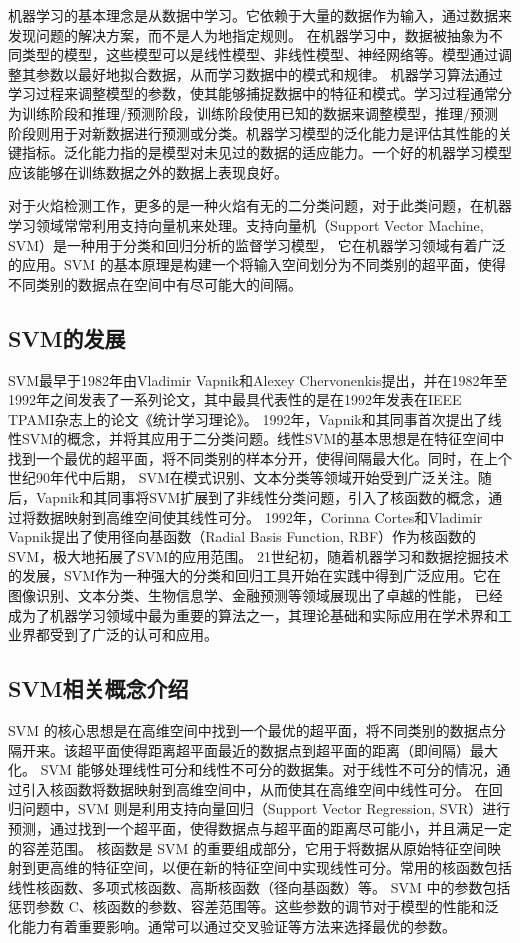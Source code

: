 机器学习的基本理念是从数据中学习。它依赖于大量的数据作为输入，通过数据来发现问题的解决方案，而不是人为地指定规则。
在机器学习中，数据被抽象为不同类型的模型，这些模型可以是线性模型、非线性模型、神经网络等。模型通过调整其参数以最好地拟合数据，从而学习数据中的模式和规律。
机器学习算法通过学习过程来调整模型的参数，使其能够捕捉数据中的特征和模式。学习过程通常分为训练阶段和推理/预测阶段，训练阶段使用已知的数据来调整模型，推理/预测
阶段则用于对新数据进行预测或分类。机器学习模型的泛化能力是评估其性能的关键指标。泛化能力指的是模型对未见过的数据的适应能力。一个好的机器学习模型应该能够在训练数据之外的数据上表现良好。

对于火焰检测工作，更多的是一种火焰有无的二分类问题，对于此类问题，在机器学习领域常常利用支持向量机来处理。支持向量机（Support Vector Machine, SVM）是一种用于分类和回归分析的监督学习模型，
它在机器学习领域有着广泛的应用。SVM 的基本原理是构建一个将输入空间划分为不同类别的超平面，使得不同类别的数据点在空间中有尽可能大的间隔。
\subsection{SVM的发展}
SVM最早于1982年由Vladimir Vapnik和Alexey Chervonenkis提出\cite{stitson1996theory}，并在1982年至1992年之间发表了一系列论文，其中最具代表性的是在1992年发表在IEEE TPAMI杂志上的论文《统计学习理论》。
1992年，Vapnik和其同事首次提出了线性SVM的概念，并将其应用于二分类问题\cite{chapelle1999support}。线性SVM的基本思想是在特征空间中找到一个最优的超平面，将不同类别的样本分开，使得间隔最大化。同时，在上个世纪90年代中后期，
SVM在模式识别、文本分类等领域开始受到广泛关注。随后，Vapnik和其同事将SVM扩展到了非线性分类问题，引入了核函数的概念，\cite{cortes1995support}通过将数据映射到高维空间使其线性可分。
1992年，Corinna Cortes和Vladimir Vapnik提出了使用径向基函数（Radial Basis Function, RBF）作为核函数的SVM，极大地拓展了SVM的应用范围。
21世纪初，随着机器学习和数据挖掘技术的发展，SVM作为一种强大的分类和回归工具开始在实践中得到广泛应用。它在图像识别、文本分类、生物信息学、金融预测等领域展现出了卓越的性能，
已经成为了机器学习领域中最为重要的算法之一，其理论基础和实际应用在学术界和工业界都受到了广泛的认可和应用。
\subsection{SVM相关概念介绍}
SVM 的核心思想是在高维空间中找到一个最优的超平面，将不同类别的数据点分隔开来。该超平面使得距离超平面最近的数据点到超平面的距离（即间隔）最大化。
SVM 能够处理线性可分和线性不可分的数据集。对于线性不可分的情况，通过引入核函数将数据映射到高维空间中，从而使其在高维空间中线性可分。
在回归问题中，SVM 则是利用支持向量回归（Support Vector Regression, SVR）进行预测，通过找到一个超平面，使得数据点与超平面的距离尽可能小，并且满足一定的容差范围。
核函数是 SVM 的重要组成部分，它用于将数据从原始特征空间映射到更高维的特征空间，以便在新的特征空间中实现线性可分。常用的核函数包括线性核函数、多项式核函数、高斯核函数（径向基函数）等。
SVM 中的参数包括惩罚参数 C、核函数的参数、容差范围等。这些参数的调节对于模型的性能和泛化能力有着重要影响。通常可以通过交叉验证等方法来选择最优的参数。






